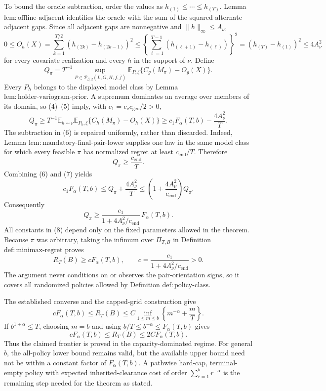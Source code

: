To bound the oracle subtraction, order the values as \(h_{(1)}\le\cdots\le h_{(T)}\).  Lemma \(\mathrm{lem:offline\text{-}adjacent}\) identifies the oracle with the sum of the squared alternate adjacent gaps.  Since all adjacent gaps are nonnegative and \(\|h\|_\infty\le A_\nu\),
\[
0\le O_h(X)
=\sum_{k=1}^{T/2}(h_{(2k)}-h_{(2k-1)})^2
\le\left\{\sum_{\ell=1}^{T-1}(h_{(\ell+1)}-h_{(\ell)})\right\}^2
=(h_{(T)}-h_{(1)})^2
\le 4A_\nu^2
\tag{5}
\]
for every covariate realization and every \(h\) in the support of \(\nu\).  Define
\[
Q_\pi
=T^{-1}\sup_{P\in\mathcal P_{\beta,d}(L,G,H,\underline f,\overline f)}
 \mathbb E_{P,\xi}\{C_g(M_\pi)-O_g(X)\}.
\]
Every \(P_h\) belongs to the displayed model class by Lemma \(\mathrm{lem:holder\text{-}variogram\text{-}prior}\).  A supremum dominates an average over members of its domain, so (4)--(5) imply, with \(c_1=c_\nu c_{\mathrm{geo}}/2>0\),
\[
Q_\pi
\ge T^{-1}\mathbb E_{h\sim\nu}
 \mathbb E_{P_h,\xi}\{C_h(M_\pi)-O_h(X)\}
\ge c_1F_\alpha(T,b)-\frac{4A_\nu^2}{T}.
\tag{6}
\]
The subtraction in (6) is repaired uniformly, rather than discarded.  Indeed, Lemma \(\mathrm{lem:mandatory\text{-}final\text{-}pair\text{-}lower}\) supplies one law in the same model class for which every feasible \(\pi\) has normalized regret at least \(c_{\mathrm{end}}/T\).  Therefore
\[
Q_\pi\ge \frac{c_{\mathrm{end}}}{T}.
\tag{7}
\]
Combining (6) and (7) yields
\[
c_1F_\alpha(T,b)
\le Q_\pi+\frac{4A_\nu^2}{T}
\le \left(1+\frac{4A_\nu^2}{c_{\mathrm{end}}}\right)Q_\pi.
\]
Consequently
\[
Q_\pi\ge
\frac{c_1}{1+4A_\nu^2/c_{\mathrm{end}}}\,F_\alpha(T,b).
\tag{8}
\]
All constants in (8) depend only on the fixed parameters allowed in the theorem.  Because \(\pi\) was arbitrary, taking the infimum over \(\Pi_{T,B}\) in Definition \(\mathrm{def:minimax\text{-}regret}\) proves
\[
R_T(B)\ge cF_\alpha(T,b),
\qquad
c=\frac{c_1}{1+4A_\nu^2/c_{\mathrm{end}}}>0.
\]
The argument never conditions on or observes the pair-orientation signs, so it covers all randomized policies allowed by Definition \(\mathrm{def:policy\text{-}class}\).

The established converse and the capped-grid construction give
\[
cF_\alpha(T,b)
\le R_T(B)
\le C\inf_{1\le m\le b}\left\{m^{-\alpha}+\frac{m}{T}\right\}.
\]
If \(b^{1+\alpha}\le T\), choosing \(m=b\) and using \(b/T\le b^{-\alpha}\le F_\alpha(T,b)\) gives
\[
cF_\alpha(T,b)\le R_T(B)\le 2C F_\alpha(T,b).
\]
Thus the claimed frontier is proved in the capacity-dominated regime.  For general \(b\), the all-policy lower bound remains valid, but the available upper bound need not be within a constant factor of \(F_\alpha(T,b)\).  A pathwise hard-cap, terminal-empty policy with expected inherited-clearance cost of order \(\sum_{r=1}^b r^{-\alpha}\) is the remaining step needed for the theorem as stated.

